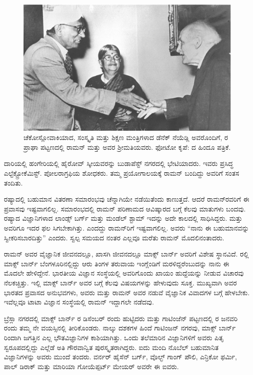 \begin{figure}[!b]
\centering
\includegraphics[scale=0.225]{"images/9.jpg"}
\caption{ಚೆಕೋಸ್ಲೋವಾಕಿಯಾದ, ಸಂಸ್ಕೃತಿ ಮತ್ತು ಶಿಕ್ಷಣ ಮಂತ್ರಿಗಳಾದ ಡೆನೆಕ್ ನೆಯೆಡ್ಲಿ ಅವರೊಂದಿಗೆ, ರ ಪ್ರಾಘಾ ಪಟ್ಟಣದಲ್ಲಿ ರಾಮನ್ ಮತ್ತು ಅವರ ಶ‍್ರೀಮತಿಯವರು. ಫೋಟೋ ಕೃಪೆ: ದ ಹಿಂದೂ ಪತ್ರಿಕೆ.}\label{chap3-fig02}
\end{figure}

ದಾರಿಯಲ್ಲಿ ಹಂಗೇರಿಯಲ್ಲಿ ಹೈರೋವ್ ಸ್ಕೀಯವರನ್ನು ಬುಡಾಪೆಸ್ಟ್ ನಗರದಲ್ಲಿ ಭೇಟಿಯಾದರು. ಇವರು ಪ್ರಸಿದ್ಧ ಎಲ್ಟೆಕ್ಟ್ರೋಕೆಮಿಸ್ಟ್. ಪೋಲರಾಗ್ರಫಿಯ ಶೋಧಕರು. ತಮ್ಮ ಪ್ರಯೋಗಾಲಯಕ್ಕೆ ರಾಮನ್ ಬಂದಿದ್ದು ಅವರಿಗೆ ಸಂತಸ ತಂದಿತು.

ರಷ್ಯಾದಲ್ಲಿ ಬಹುಮಾನ ವಿತರಣಾ ಸಮಾರಂಭವು ಚೆನ್ನಾಗಿಯೇ ನಡೆಯಿತೆಂದು ಕಾಣುತ್ತದೆ. ಆದರೆ ರಾಮನ್‍ರವರಿಗೆ ಈ ಪ್ರವಾಸವು ಇಷ್ಟವಾಗಲಿಲ್ಲ. ಸಮಾರಂಭದಲ್ಲಿ ರಾಮನ್ ಪರಿಣಾಮದ ಆವಿಷ್ಕಾರದ ಬಗ್ಗೆ ಕೆಲವು ಮಾತುಗಳು ಬಂದವು. ರಷ್ಯಾದ ವಿಜ್ಞಾನಿಗಳಾದ ಲಾಂಡ್ಸ್ ಬರ್ಗ್ ಮತ್ತು ಮಂಡೆಲ್ ಶ್ಟಾಮ್ ಇದನ್ನು ಅದೇ ಕಾಲದಲ್ಲಿ ಸಾಧಿಸಿದ್ದರು. ಮತ್ತು ಅವರಿಗೂ ಇದರ ಫಲ ಸಿಗಬೇಕಾಗಿತ್ತು. ಎಂದದ್ದು ರಾಮನ್‍ರಿಗೆ ಇಷ್ಟವಾಗಲಿಲ್ಲ. ಅವರು “ನಾನು ಈ ಬಹುಮಾನವನ್ನು ಸ್ವೀಕರಿಸಬಾರದಿತ್ತು” ಎಂದರು. ಸ್ವಲ್ಪ ಸಮಯದ ನಂತರ ಎಲ್ಲವೂ ಮರೆತು ರಾಮನ್ ಮೊದಲಿ\-ನಂತಾದರು.



ರಾಮನ್ ಅವರ ವೈಜ್ಞಾನಿಕ ಜೀವನದಲ್ಲೂ, ಖಾಸಗಿ ಜೀವನದಲ್ಲೂ ಮಾಕ್ಸ್ ಬಾರ್ನ್ ಅವರಿಗೆ ವಿಶೇಷ ಸ್ಥಾನವಿದೆ. ರಲ್ಲಿ ಮಾಕ್ಸ್ ಬಾರ್ನ್ ಬೆಂಗಳೂರಿನಲ್ಲಿದ್ದು ಆರು ತಿಂಗಳ ತರುವಾಯ ಇಂಗ್ಲೆಂಡಿಗೆ ಮರಳಿದ್ದರೆಂಬುದನ್ನು ನಾನು ಈ ಮೊದಲೇ ಹೇಳಿದ್ದೇನೆ. ಭಾರತೀಯ ವಿಜ್ಞಾನ ಸಂಸ್ಥೆಯಲ್ಲಿ ಅವರಿಗೊಂದು ಖಾಯಂ ಹುದ್ದೆಯನ್ನು ನೀಡುವ ವಿಚಾರವು ನೆಲಕಚ್ಚಿತ್ತು. ಇಲ್ಲಿ ಮಾಕ್ಸ್ ಬಾರ್ನ್ ಅವರ ಬಗ್ಗೆ ಕೆಲವು ವಿಷಯಗಳನ್ನು ಹೇಳುವುದು ಸೂಕ್ತ. ಮುಖ್ಯವಾಗಿ ಅವರ ಭಾರತದ ಪ್ರವಾಸದ ಅನುಭವಗಳು, ಅವರು ಮತ್ತು ರಾಮನ್ ಅವರ ನಡುವೆ ವೈಜ್ಞಾನಿಕ ವಿವಾದಗಳ ಬಗ್ಗೆ ಹೇಳಬೇಕು. ಇವೆಲ್ಲವೂ ಟಾಟಾ ವಿಜ್ಞಾನ ಸಂಸ್ಥೆಯಲ್ಲಿ ರಾಮನ್ ಇದ್ದಾಗಲೇ ನಡೆದವು.

ಬ್ರೆಸ್ಲಾ ನಗರದಲ್ಲಿ ಮಾಕ್ಸ್ ಬಾರ್ನ್ ರ ಡಿಸೆಂಬರ್  ರಂದು ಹುಟ್ಟಿದರು ಮತ್ತು ಗಾಟಿಂಜೆನ್ ಪಟ್ಟಣದಲ್ಲಿ ರ ಜನವರಿ  ರಂದು ತಮ್ಮ ನೇ ವಯಸ್ಸಿನಲ್ಲಿ ತೀರಿಕೊಂಡರು. ನಾಲ್ಕು ದಶಕಗಳ ಹಿಂದೆ ಗಾಟಿಂಜನ್ ನಗರವು, ಮಾಕ್ಸ್ ಬಾರ್ನ್ ರಿಂದಾಗಿ ಜಗತ್ತಿನ ಎಲ್ಲ ಭೌತವಿಜ್ಞಾನಿಗಳ ಕಾಶಿಯಾಗಿತ್ತು. ಒಂದು ತಲೆಮಾರಿನ ವಿಜ್ಞಾನಿಗಳಿಗೆ ಅವರು ಪಿತೃ ಸ್ವರೂಪದಲ್ಲಿದ್ದು ಎಲ್ಲೆಡೆ ಅತಿ ಗೌರವಾನ್ವಿತ ಪುರಸ್ಕೃತರಾಗಿದ್ದರು. ಐದು ಮಂದಿ ನೊಬೆಲ್ ಬಹುಮಾನಿತ ವಿಜ್ಞಾನಿಗಳನ್ನು ಅವರು ಮುಂದೆ ತಂದರು. ವರ್ನರ್ ಹೈಸೆನ್ ಬರ್ಗ್, ವೊಲ್ಛ್ ಗಾಂಗ್ ಪೌಲಿ, ಎನ್ರಿಕೋ ಫರ್ಮಿ, ಪಾಲ್ ಡಿರಾಕ್ ಮತ್ತು ಮಾರಿಯಾ ಗೋಯೆಪ್ಪರ್ಟ್ ಮೇಯರ್ ಅವರೇ ಈ ಐವರು.

